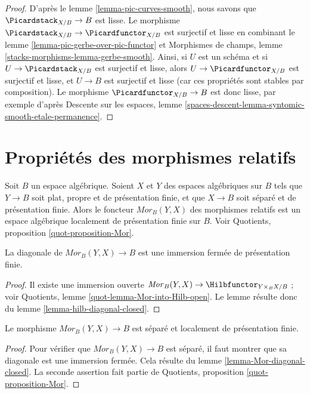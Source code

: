 \begin{proof}
D'après le lemme \ref{lemma-pic-curves-smooth}, nous savons que
$\Picardstack_{X/B} \to B$ est lisse. Le morphisme
$\Picardstack_{X/B} \to \Picardfunctor_{X/B}$ est surjectif et lisse en
combinant le lemme \ref{lemma-pic-gerbe-over-pic-functor} et Morphismes de
champs, lemme \ref{stacks-morphisms-lemma-gerbe-smooth}.
Ainsi, si $U$ est un schéma et si
$U \to \Picardstack_{X/B}$ est surjectif et lisse, alors
$U \to \Picardfunctor_{X/B}$ est surjectif et lisse, et
$U \to B$ est surjectif et lisse (car ces propriétés sont stables par
composition). Le morphisme $\Picardfunctor_{X/B} \to B$ est donc lisse,
par exemple d'après Descente sur les espaces, lemme
\ref{spaces-descent-lemma-syntomic-smooth-etale-permanence}.
\end{proof}






\section{Propriétés des morphismes relatifs}
\label{section-relative-morphisms}

\noindent
Soit $B$ un espace algébrique. Soient $X$ et $Y$ des espaces algébriques
sur $B$ tels que $Y \to B$ soit plat, propre et de présentation finie, et
que $X \to B$ soit séparé et de présentation finie.
Alors le foncteur $\mathit{Mor}_B(Y, X)$ des morphismes relatifs est un
espace algébrique localement de présentation finie sur $B$.
Voir Quotients, proposition \ref{quot-proposition-Mor}.

\begin{lemma}
\label{lemma-Mor-diagonal-closed}
La diagonale de $\mathit{Mor}_B(Y, X) \to B$ est une immersion fermée de
présentation finie.
\end{lemma}

\begin{proof}
Il existe une immersion ouverte
$\mathit{Mor}_B(Y, X) \to \Hilbfunctor_{Y \times_B X/B}$ ; voir
Quotients, lemme \ref{quot-lemma-Mor-into-Hilb-open}.
Le lemme résulte donc du lemme \ref{lemma-hilb-diagonal-closed}.
\end{proof}

\begin{lemma}
\label{lemma-Mor-s-lfp}
Le morphisme $\mathit{Mor}_B(Y, X) \to B$ est séparé et localement de
présentation finie.
\end{lemma}

\begin{proof}
Pour vérifier que $\mathit{Mor}_B(Y, X) \to B$ est séparé, il faut montrer
que sa diagonale est une immersion fermée. Cela résulte du lemme
\ref{lemma-Mor-diagonal-closed}. La seconde assertion fait partie de
Quotients, proposition \ref{quot-proposition-Mor}.
\end{proof}

